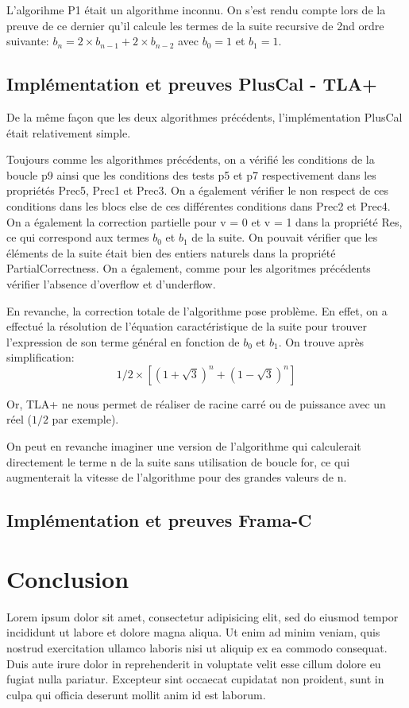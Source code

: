 \documentclass[a4paper,11pt, oneside]{book}
\begin{document}
		L'algorihme P1 était un algorithme inconnu. On s'est rendu compte lors de la
		preuve de ce dernier qu'il calcule les termes de la suite recursive de 2nd
		ordre suivante: $b_n = 2 \times b_{n-1} + 2 \times b_{n-2}$ avec $b_0 = 1$ et $b_1 = 1$.

		\section{Implémentation et preuves PlusCal - TLA+}

		De la même façon que les deux algorithmes précédents, l'implémentation PlusCal
		était relativement simple.

		Toujours comme les algorithmes précédents, on a vérifié les conditions de la boucle
		p9 ainsi que les conditions des tests p5 et p7 respectivement dans les propriétés
		Prec5, Prec1 et Prec3. On a également vérifier le non respect de ces conditions
		dans les blocs else de ces différentes conditions dans Prec2 et Prec4. On a
		également la correction partielle pour v = 0 et v = 1 dans la propriété Res,
		ce qui correspond aux termes $b_0$ et $b_1$ de la suite. On pouvait vérifier
		que les éléments de la suite était bien des entiers naturels dans la propriété
		PartialCorrectness. On a également, comme pour les algoritmes précédents vérifier
		l'absence d'overflow et d'underflow.

		En revanche, la correction totale de l'algorithme pose problème. En effet,
		on a effectué la résolution de l'équation caractéristique de la suite pour trouver
		l'expression de son terme général en fonction de $b_0$ et $b_1$.
		On trouve après simplification:
		$$1/2 \times [(1 + \sqrt 3)^n + (1 - \sqrt 3)^n]$$

		Or, TLA+ ne nous permet de réaliser de racine carré ou de puissance avec
		un réel ($1/2$ par exemple).

		On peut en revanche imaginer une version de l'algorithme qui calculerait
		directement le terme n de la suite sans utilisation de boucle for, ce qui
		augmenterait la vitesse de l'algorithme pour des grandes valeurs de n.


		\section{Implémentation et preuves Frama-C}

	\chapter{Conclusion}
		Lorem ipsum dolor sit amet, consectetur adipisicing elit, sed do eiusmod tempor incididunt ut labore et dolore magna aliqua. Ut enim ad minim veniam, quis nostrud exercitation ullamco laboris nisi ut aliquip ex ea commodo consequat. Duis aute irure dolor in reprehenderit in voluptate velit esse cillum dolore eu fugiat nulla pariatur. Excepteur sint occaecat cupidatat non proident, sunt in culpa qui officia deserunt mollit anim id est laborum.
\end{document}
